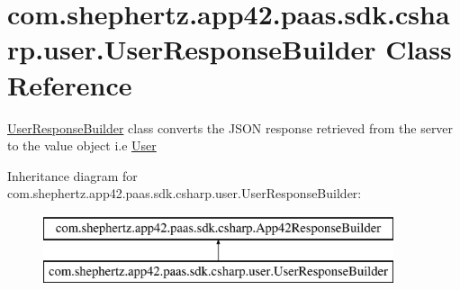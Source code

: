 \hypertarget{classcom_1_1shephertz_1_1app42_1_1paas_1_1sdk_1_1csharp_1_1user_1_1_user_response_builder}{\section{com.\+shephertz.\+app42.\+paas.\+sdk.\+csharp.\+user.\+User\+Response\+Builder Class Reference}
\label{classcom_1_1shephertz_1_1app42_1_1paas_1_1sdk_1_1csharp_1_1user_1_1_user_response_builder}
}


\hyperlink{classcom_1_1shephertz_1_1app42_1_1paas_1_1sdk_1_1csharp_1_1user_1_1_user_response_builder}{User\+Response\+Builder} class converts the J\+S\+O\+N response retrieved from the server to the value object i.\+e \hyperlink{classcom_1_1shephertz_1_1app42_1_1paas_1_1sdk_1_1csharp_1_1user_1_1_user}{User}  


Inheritance diagram for com.\+shephertz.\+app42.\+paas.\+sdk.\+csharp.\+user.\+User\+Response\+Builder\+:\begin{figure}[H]
\begin{center}
\leavevmode
\includegraphics[height=2.000000cm]{classcom_1_1shephertz_1_1app42_1_1paas_1_1sdk_1_1csharp_1_1user_1_1_user_response_builder}
\end{center}
\end{figure}
